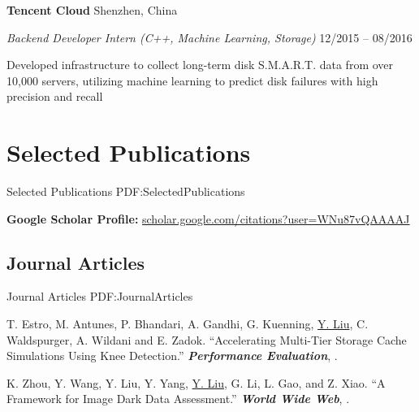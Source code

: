 \documentclass[a4paper,10pt,oneside]{article}
\begin{document}
\begin{body}
\GapNoBreak
{\textbf{Tencent Cloud}} 
\hfill
Shenzhen, China

\emph{Backend Developer Intern (C++, Machine Learning, Storage)}
\hfill
12/2015 --
08/2016

\GapNoBreak
\BulletItem
Developed infrastructure to collect long-term disk S.M.A.R.T. data from over 10,000 servers, utilizing machine learning to predict disk failures with high precision and recall 



\section
{Selected Publications}
{Selected Publications}
{PDF:SelectedPublications}


\textbf{Google Scholar Profile:} \href{https://scholar.google.com/citations?user=WNu87vQAAAAJ}{scholar.google.com/citations?user=WNu87vQAAAAJ}

\subsection
{Journal Articles}
{Journal Articles}
{PDF:JournalArticles}

\NumberedItem{[1]}
T. Estro, M. Antunes, P. Bhandari, A. Gandhi, G. Kuenning, \underline{Y. Liu}, C. Waldspurger, A. Wildani and E. Zadok.
``Accelerating Multi-Tier Storage Cache Simulations Using Knee Detection.'' 
\textit{\textbf{Performance Evaluation}},
.


\NumberedItem{[2]}
K. Zhou, Y. Wang, Y. Liu, Y. Yang, \underline{Y. Liu}, G. Li, L. Gao, and Z. Xiao.
``A Framework for Image Dark Data Assessment.'' 
\textit{\textbf{World Wide Web}},
.



\end{body}
\end{document}
